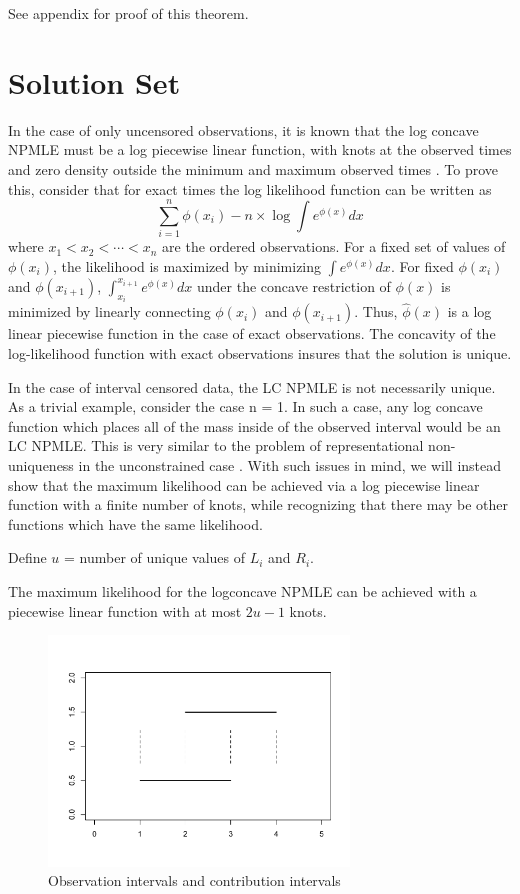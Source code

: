 	See appendix for proof of this theorem. 	


{\section{Solution Set}}
\label{sec:2}

	In the case of only uncensored observations, it is known that the log concave NPMLE must be a log piecewise linear function, with knots at the observed times and zero density outside the minimum and maximum observed times \cite{RefRuf2007}. To prove this, consider that for exact times the log likelihood function can be written as	
	\[ \displaystyle \sum_{i = 1}^n \phi(x_i) - n \times \log \int e^{\phi(x)} dx
	\]
where $x_1<x_2<\cdots<x_n$ are the ordered observations. For a fixed set of values of $\phi(x_i)$, the likelihood is maximized by minimizing $\int e^{\phi(x)} dx$. For fixed $\phi(x_i)$ and $\phi(x_{i+1})$, $\int_{x_i}^{x_{i+1}} e^{\phi(x)}dx$ under the concave restriction of $\phi(x)$ is minimized by linearly connecting $\phi(x_i)$ and $\phi(x_{i+1})$. Thus, $\hat \phi(x)$ is a log linear piecewise function in the case of exact observations. The concavity of the log-likelihood function with exact observations insures that the solution is unique.
		
	In the case of interval censored data, the LC NPMLE is not necessarily unique. As a trivial example, consider the case n = 1. In such a case, any log concave function which places all of the mass inside of the observed interval would be an LC NPMLE. This is very similar to the problem of representational non-uniqueness in the unconstrained case \cite{RefGV2002}. With such issues in mind, we will instead show that the maximum likelihood can be achieved via a log piecewise linear function with a finite number of knots, while recognizing that there may be other functions which have the same likelihood. 
	
	Define $u$ = number of unique values of $L_i$ and $R_i$. 

	\vspace{3mm}

	\begin{thm}
	\label{thm1}
	The maximum likelihood for the logconcave NPMLE can be achieved with a piecewise linear function with at most $2u-1$ knots.
	\end{thm}
	
\begin{figure}[h]
\centerline{\includegraphics[width = 8cm]{ContrbInt.pdf} }
\caption{Observation intervals and contribution intervals}
\end{figure}	

